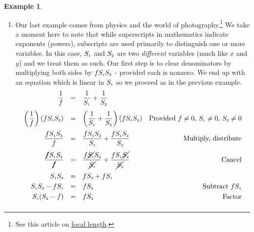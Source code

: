 \documentclass[11pt]{article}
\theoremstyle{definition}  %
\newtheorem{ex}{\bf Example}
\begin{document}
\begin{ex}
\begin{enumerate}
\item  Our last example comes from physics and the world of photography.\footnote{See this article on \href{https://en.wikipedia.org/wiki/Focal_length}{\underline{focal length}}.}  We take a moment here to note that while superscripts in mathematics indicate exponents (powers), subscripts are used primarily to distinguish one or more variables.  In this case, $S_{\text{\tiny $1$}}$ and $S_{\text{\tiny $2$}}$ are two \textit{different} variables (much like $x$ and $y$) and we treat them as such. Our first step is to clear denominators by multiplying both sides by $f S_{\text{\tiny $1$}} S_{\text{\tiny $2$}}$ - provided each is nonzero.  We end up with an equation which is linear in $S_{\text{\tiny $1$}}$ so we proceed as in the previous example.  \[ \begin{array}{rclr}

\dfrac{1}{f} & = & \dfrac{1}{S_{\text{\tiny $1$}}} + \dfrac{1}{S_{\text{\tiny $2$}}} & \\ [12pt]


\left(\dfrac{1}{f}\right)(fS_{\text{\tiny $1$}}S_{\text{\tiny $2$}}) & = & \left(\dfrac{1}{S_{\text{\tiny $1$}}} + \dfrac{1}{S_{\text{\tiny $2$}}}\right) (fS_{\text{\tiny $1$}}S_{\text{\tiny $2$}}) & \text{Provided $f \neq 0$, $S_{\text{\tiny $1$}} \neq 0$, $S_{\text{\tiny $2$}}\neq 0$} \\ [12pt]

\dfrac{fS_{\text{\tiny $1$}}S_{\text{\tiny $2$}}}{f} & = & \dfrac{fS_{\text{\tiny $1$}}S_{\text{\tiny $2$}}}{S_{\text{\tiny $1$}}} + \dfrac{fS_{\text{\tiny $1$}}S_{\text{\tiny $2$}}}{S_{\text{\tiny $2$}}} & \text{Multiply, distribute} \\ [12pt]


\dfrac{\cancel{f}S_{\text{\tiny $1$}}S_{\text{\tiny $2$}}}{\cancel{f}} & = & \dfrac{f\cancel{S_{\text{\tiny $1$}}}S_{\text{\tiny $2$}}}{\cancel{S_{\text{\tiny $1$}}}} + \dfrac{fS_{\text{\tiny $1$}}\cancel{S_{\text{\tiny $2$}}}}{\cancel{S_{\text{\tiny $2$}}}} & \text{Cancel} \\ [12pt]

S_{\text{\tiny $1$}}S_{\text{\tiny $2$}} & = & f S_{\text{\tiny $2$}} + fS_{\text{\tiny $1$}} & \\ [3pt]

S_{\text{\tiny $1$}}S_{\text{\tiny $2$}}  - fS_{\text{\tiny $1$}} & = & f S_{\text{\tiny $2$}}   &  \text{Subtract $fS_{\text{\tiny $1$}}$} \\ [3pt]

S_{\text{\tiny $1$}}(S_{\text{\tiny $2$}} - f) & = & f S_{\text{\tiny $2$}} & \text{Factor}  \\ [5pt]


\end{array}\]
\end{enumerate}
\end{ex}
\end{document}

